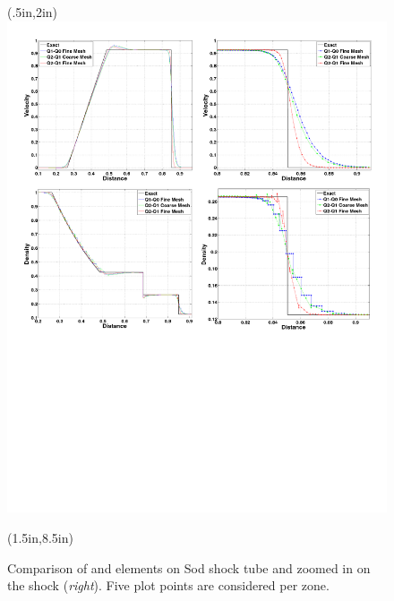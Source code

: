\newpage
\begin{figure}[h!]
\begin{textblock*}{7.5in}(.5in,2in)
\centering
   \includegraphics[trim = 0in 3.5in 0in 0in,clip,width=7.5in,keepaspectratio=true]{./Figures/SodCompare.pdf}
\end{textblock*}
\begin{textblock*}{5.5in}(1.5in,8.5in)
\caption{Comparison of  and  elements on Sod shock tube and zoomed in on the shock (\textit{right}). Five plot points are considered per zone.}
 \label{fig:SodCompare}
\end{textblock*}
\end{figure}
\mbox{}\clearpage
\newpage

